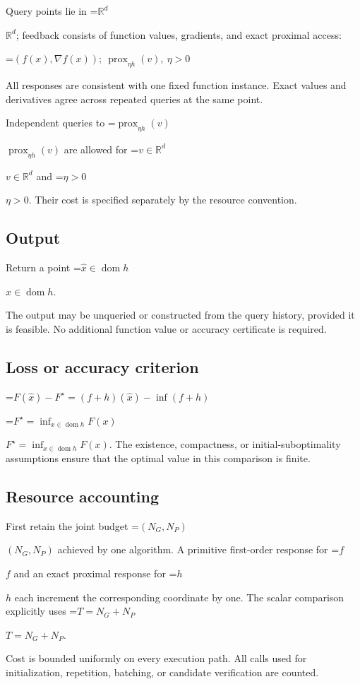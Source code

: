 \documentclass[10pt,a4paper]{article}
\newcommand{\AtlasMath}[1]{\par\begingroup\centering\setbox0=\hbox{$\displaystyle #1$}\ifdim\wd0>1.4\linewidth\typeout{ATLAS WIDE FORMULA: \the\wd0}\fi\ifdim\wd0>\linewidth\resizebox{\linewidth}{!}{\box0}\else\box0\fi\par\endgroup}
\newcommand{\AtlasInlineMath}[1]{\begingroup\setbox0=\hbox{$#1$}\ifdim\wd0>.4\linewidth\endgroup\AtlasMath{#1}\else\endgroup$#1$\fi}
\begin{document}
Query points lie in \AtlasInlineMath{\mathbb{R}^d}; feedback consists of function values, gradients, and exact proximal access:


\AtlasMath{(f(x),\nabla f(x));\ \operatorname{prox}_{\eta h}(v),\ \eta>0}


All responses are consistent with one fixed function instance. Exact values and derivatives agree across repeated queries at the same point.

Independent queries to \AtlasInlineMath{\operatorname{prox}_{\eta h}(v)} are allowed for \AtlasInlineMath{v\in\mathbb R^d} and \AtlasInlineMath{\eta>0}. Their cost is specified separately by the resource convention.

\subsection{Output}
Return a point \AtlasInlineMath{\widehat x\in\operatorname{dom}h}.

The output may be unqueried or constructed from the query history, provided it is feasible. No additional function value or accuracy certificate is required.

\subsection{Loss or accuracy criterion}

\AtlasMath{F(\widehat{x})-F^\star=(f+h)(\widehat{x})-\inf(f+h)}


\AtlasInlineMath{F^\star=\inf_{x\in \operatorname{dom}h}F(x)}. The existence, compactness, or initial-suboptimality assumptions ensure that the optimal value in this comparison is finite.

\subsection{Resource accounting}
First retain the joint budget \AtlasInlineMath{(N_G,N_P)} achieved by one algorithm. A primitive first-order response for \AtlasInlineMath{f} and an exact proximal response for \AtlasInlineMath{h} each increment the corresponding coordinate by one. The scalar comparison explicitly uses \AtlasInlineMath{T=N_G+N_P}.

Cost is bounded uniformly on every execution path. All calls used for initialization, repetition, batching, or candidate verification are counted.
\end{document}
